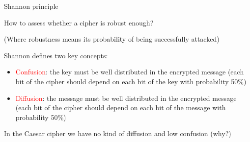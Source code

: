 \begin{frame}{Shannon principle}

  How to assess whether a cipher is robust enough? 
  
  (Where robustness means its probability of being successfully attacked)
  
  \medskip

  Shannon defines two key concepts:
  
  \begin{itemize}
    \item \textcolor{red}{Confusion}: the key must be well distributed in the encrypted message (each bit of the cipher should depend on each bit of the key with probability 50\%)
    \item \textcolor{red}{Diffusion}: the message must be well distributed in the encrypted message (each bit of the cipher should depend on each bit of the message with probability 50\%)
  \end{itemize}
  
  \medskip
  
  In the Caesar cipher we have no kind of diffusion and low confusion (why?)

\end{frame}

